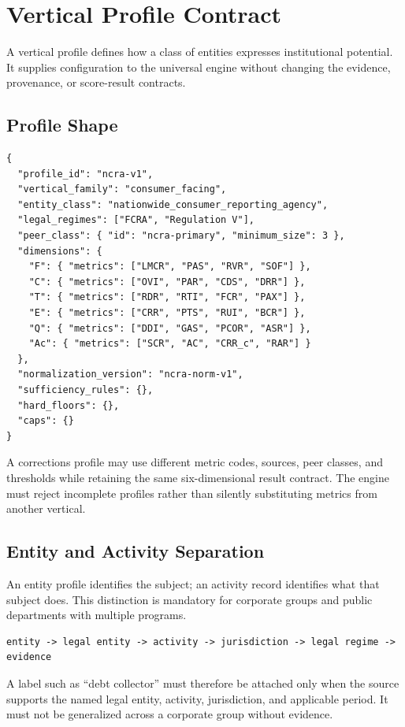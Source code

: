 \section{Vertical Profile Contract}

A vertical profile defines how a class of entities expresses institutional
potential. It supplies configuration to the universal engine without changing
the evidence, provenance, or score-result contracts.

\subsection{Profile Shape}

\begin{lstlisting}
{
  "profile_id": "ncra-v1",
  "vertical_family": "consumer_facing",
  "entity_class": "nationwide_consumer_reporting_agency",
  "legal_regimes": ["FCRA", "Regulation V"],
  "peer_class": { "id": "ncra-primary", "minimum_size": 3 },
  "dimensions": {
    "F": { "metrics": ["LMCR", "PAS", "RVR", "SOF"] },
    "C": { "metrics": ["OVI", "PAR", "CDS", "DRR"] },
    "T": { "metrics": ["RDR", "RTI", "FCR", "PAX"] },
    "E": { "metrics": ["CRR", "PTS", "RUI", "BCR"] },
    "Q": { "metrics": ["DDI", "GAS", "PCOR", "ASR"] },
    "Ac": { "metrics": ["SCR", "AC", "CRR_c", "RAR"] }
  },
  "normalization_version": "ncra-norm-v1",
  "sufficiency_rules": {},
  "hard_floors": {},
  "caps": {}
}
\end{lstlisting}

A corrections profile may use different metric codes, sources, peer classes,
and thresholds while retaining the same six-dimensional result contract. The
engine must reject incomplete profiles rather than silently substituting
metrics from another vertical.

\subsection{Entity and Activity Separation}

An entity profile identifies the subject; an activity record identifies what
that subject does. This distinction is mandatory for corporate groups and
public departments with multiple programs.

\begin{lstlisting}
entity -> legal entity -> activity -> jurisdiction -> legal regime -> evidence
\end{lstlisting}

A label such as ``debt collector'' must therefore be attached only when the
source supports the named legal entity, activity, jurisdiction, and applicable
period. It must not be generalized across a corporate group without evidence.
